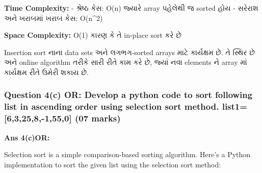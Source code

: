 \textbf{Time Complexity:} - શ્રેષ્ઠ કેસ: O(n) જ્યારે array પહેલેથી જ sorted હોય
- સરેરાશ અને ખરાબમાં ખરાબ કેસ: O(n\^{}2)

\textbf{Space Complexity:} O(1) કારણ કે તે in-place sort કરે છે

Insertion sort નાના data sets અને લગભગ-sorted arrays માટે કાર્યક્ષમ છે. તે
સ્થિર છે અને online algorithm તરીકે સારી રીતે કામ કરે છે, જ્યાં નવા elements ને
array માં કાર્યક્ષમ રીતે ઉમેરી શકાય છે.

\hypertarget{question-4c-or-develop-a-python-code-to-sort-following-list-in-ascending-order-using-selection-sort-method.-list163258-1550-07-marks}{%
\subsubsection{Question 4(c) OR: Develop a python code to sort following
list in ascending order using selection sort method.
list1={[}6,3,25,8,-1,55,0{]} (07
marks)}\label{question-4c-or-develop-a-python-code-to-sort-following-list-in-ascending-order-using-selection-sort-method.-list163258-1550-07-marks}}

\textbf{Ans 4(c)OR:}

Selection sort is a simple comparison-based sorting algorithm. Here's a
Python implementation to sort the given list using the selection sort
method:

\begin{Shaded}
\begin{Highlighting}[]
\OperatorTok{=} 
    
     
\OperatorTok{=}
         \OperatorTok{+} 
            \OperatorTok{\textless{}}
\OperatorTok{=}
        
\OperatorTok{=}
    

\OperatorTok{=}\NormalTok{ [}\NormalTok{, }\NormalTok{, }\NormalTok{, }\NormalTok{, }\OperatorTok{{-}}\NormalTok{, }\NormalTok{, }\NormalTok{]}

\OperatorTok{=}

\NormalTok{(}
\end{Highlighting}
\end{Shaded}

